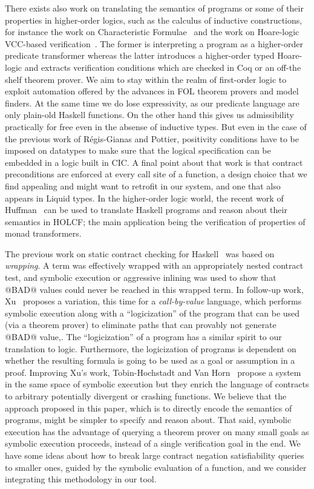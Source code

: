 There exists also work on translating the semantics of programs or some of
their properties in higher-order logics, such as the calculus of inductive
constructions, for instance the work on Characteristic Formulae~\cite{char-form} 
and the work on Hoare-logic VCC-based verification~\cite{regis-gianas-pottier-08}. The former
is interpreting a program as a higher-order predicate transformer
whereas the latter introduces a higher-order typed Hoare-logic and
extracts verification conditions which are checked in Coq or an
off-the shelf theorem prover. We aim to stay within the realm of
first-order logic to exploit automation offered by the advances in FOL
theorem provers and model finders. At the same time we do lose
expressivity, as our predicate language are only plain-old Haskell
functions. On the other hand this gives us
admissibility practically for free even in the absense of inductive
types. But even in the case of the previous work of
R\'{e}gis-Gianas and Pottier, positivity conditions have to be imposed on
datatypes to make sure that the logical specification can be embedded
in a logic built in CIC. A final point about that work
is that contract preconditions are enforced at every call site of 
a function, a design choice that we find appealing and might want 
to retrofit in our system, and one that also appears in Liquid types.
In the higher-order logic world, the recent work of 
Huffman~\cite{Huffman:2012:FVM:2364527.2364532} can be used to translate Haskell 
programs and reason about their semantics in HOLCF; the main application being
the verification of properties of monad transformers.

The previous work on static contract checking for Haskell~\cite{xu+:contracts}
was based on {\em wrapping}. A term was effectively wrapped
with an appropriately nested contract test, and symbolic execution or 
aggressive inlining was used to show that @BAD@ values could
never be reached in this wrapped term.
In follow-up work, Xu~\cite{Xu:2012:HCC:2103746.2103767} proposes a variation, this time for a
{\em call-by-value} language, which performs symbolic execution along with
a ``logicization'' of the program that can be used (via a theorem prover)
to eliminate paths that can
provably not generate @BAD@ value,. The ``logicization'' of a
program has a similar spirit to our translation to logic.
Furthermore, the logicization of programs is dependent on whether
the resulting formula is going to be used as a goal or assumption in a proof. 
Improving Xu's work, Tobin-Hochstadt and Van Horn~\cite{hochstadt-horn} propose
a system in the same space of symbolic execution but they enrich the 
language of contracts to arbitrary potentially divergent or crashing functions.
We believe that the approach proposed in this paper, which is to directly 
encode the semantics of programs, might be simpler to specify and reason about.
That said, symbolic execution has the advantage of querying a
theorem prover on many small goals as symbolic execution proceeds, instead of a
single verification goal in the end. We have some ideas about how to break large
contract negation satisfiability queries to smaller ones, guided by the symbolic 
evaluation of a function, and we consider integrating this methodology in our tool.

